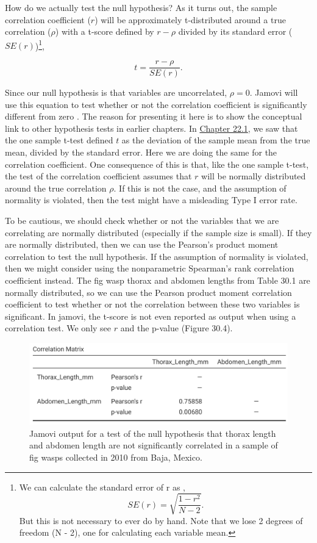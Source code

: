 \documentclass[
  openany]{krantz}
\begin{document}
How do we actually test the null hypothesis?
As it turns out, the sample correlation coefficient (\(r\)) will be approximately t-distributed around a true correlation (\(\rho\)) with a t-score defined by \(r - \rho\) divided by its standard error (\(SE(r)\))\footnote{We can calculate the standard error of r as \citep{Rahman1968}, \[SE(r) = \sqrt{\frac{1 - r^{2}}{N - 2}}.\] But this is not necessary to ever do by hand. Note that we lose 2 degrees of freedom (N - 2), one for calculating each variable mean.},

\[t = \frac{r - \rho}{SE(r)}.\]

Since our null hypothesis is that variables are uncorrelated, \(\rho = 0\).
Jamovi will use this equation to test whether or not the correlation coefficient is significantly different from zero \citep{Jamovi2022}.
The reason for presenting it here is to show the conceptual link to other hypothesis tests in earlier chapters.
In \protect\hyperlink{one-sample-t-test}{Chapter 22.1}, we saw that the one sample t-test defined \(t\) as the deviation of the sample mean from the true mean, divided by the standard error.
Here we are doing the same for the correlation coefficient.
One consequence of this is that, like the one sample t-test, the test of the correlation coefficient assumes that \(r\) will be normally distributed around the true correlation \(\rho\).
If this is not the case, and the assumption of normality is violated, then the test might have a misleading Type I error rate.

To be cautious, we should check whether or not the variables that we are correlating are normally distributed (especially if the sample size is small).
If they are normally distributed, then we can use the Pearson's product moment correlation to test the null hypothesis.
If the assumption of normality is violated, then we might consider using the nonparametric Spearman's rank correlation coefficient instead.
The fig wasp thorax and abdomen lengths from Table 30.1 are normally distributed, so we can use the Pearson product moment correlation coefficient to test whether or not the correlation between these two variables is significant.
In jamovi, the t-score is not even reported as output when using a correlation test.
We only see \(r\) and the p-value (Figure 30.4).

\begin{figure}
\includegraphics[width=1\linewidth]{img/Jamovi_correlation_output} \caption{Jamovi output for a test of the null hypothesis that thorax length and abdomen length are not significantly correlated in a sample of fig wasps collected in 2010 from Baja, Mexico.}\label{fig:unnamed-chunk-131}
\end{figure}
\end{document}
